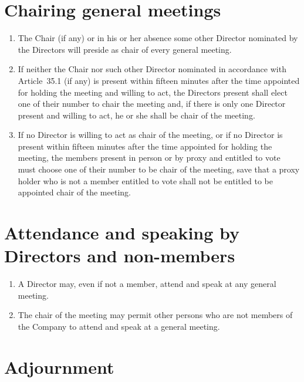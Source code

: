 \documentclass[a4paper,12pt]{article}
\begin{document}
\section{Chairing general meetings}

\begin{enumerate}
  \item The Chair (if any) or in his or her absence some other Director nominated by the Directors will preside as chair of every general meeting.
  \item If neither the Chair nor such other Director nominated in accordance with Article 35.1 (if any) is present within fifteen minutes after the time appointed for holding the meeting and willing to act, the Directors present shall elect one of their number to chair the meeting and, if there is only one Director present and willing to act, he or she shall be chair of the meeting.
  \item If no Director is willing to act as chair of the meeting, or if no Director is present within fifteen minutes after the time appointed for holding the meeting, the members present in person or by proxy and entitled to vote must choose one of their number to be chair of the meeting, save that a proxy holder who is not a member entitled to vote shall not be entitled to be appointed chair of the meeting.
\end{enumerate}

\section{Attendance and speaking by Directors and non-members}

\begin{enumerate}
  \item A Director may, even if not a member, attend and speak at any general meeting.
  \item The chair of the meeting may permit other persons who are not members of the Company to attend and speak at a general meeting.
\end{enumerate}

\section{Adjournment}
\end{document}

